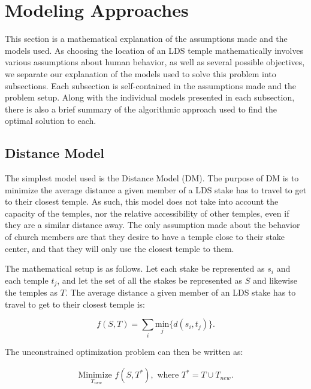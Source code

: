 \documentclass[twoside,twocolumn]{article}
\begin{document}
\section{Modeling Approaches}
\label{sec:models}
This section is a mathematical explanation of the assumptions made and the models used.
As choosing the location of an LDS temple mathematically involves various assumptions about human behavior, as well as several possible objectives, we separate our explanation of the models used to solve this problem into subsections. %
Each subsection is self-contained in the assumptions made and the problem setup.
Along with the individual models presented in each subsection, there is also a brief summary of the algorithmic approach used to find the optimal solution to each.

\subsection{Distance Model} 

The simplest model used is the Distance Model (DM).
The purpose of DM is to minimize the average distance a given member of a LDS stake has to travel to get to their closest temple.%
As such, this model does not take into account the capacity of the temples, nor the relative accessibility of other temples, even if they are a similar distance away. %
The only assumption made about the behavior of church members are that they desire to have a temple close to their stake center, and that they will only use the closest temple to them.

The mathematical setup is as follows. Let each stake be represented as $s_i$ and each temple $t_j$, and let the set of all the stakes be represented as $S$ and likewise the temples as $T$.
The average distance a given member of an LDS stake has to travel to get to their closest temple is:

\begin{equation}
	f(S,T) = \sum_i \underset{j}{\text{min}}\{d(s_i,t_j)\}.
\end{equation}

The unconstrained optimization problem can then be written as:

\begin{equation}
\begin{aligned}
	\underset{T_{new}}{\text{Minimize }} f(S,T^*), \text{ where } T^* = T \cup T_{new}.
\end{aligned}
\end{equation}
\end{document}
